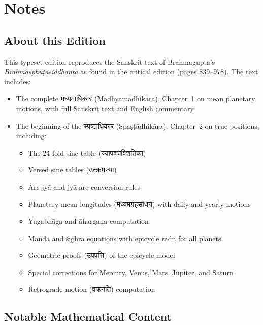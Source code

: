 \documentclass[11pt,a4paper]{book}
\newcommand{\dev}[1]{{\devanagarifont #1}}
\begin{document}
\clearpage

\appendix
\chapter{Notes}

\section{About this Edition}

This typeset edition reproduces the Sanskrit text of Brahmagupta's \emph{Brāhmasphuṭasiddhānta} as found in the critical edition (pages 839--978). The text includes:

\begin{itemize}
\item The complete \dev{मध्यमाधिकार} (Madhyamādhikāra), Chapter~1 on mean planetary motions, with full Sanskrit text and English commentary
\item The beginning of the \dev{स्पष्टाधिकार} (Spaṣṭādhikāra), Chapter~2 on true positions, including:
  \begin{itemize}
  \item The 24-fold sine table (\dev{ज्यापञ्चविंशतिका})
  \item Versed sine tables (\dev{उत्क्रमज्या})
  \item Arc-jyā and jyā-arc conversion rules
  \item Planetary mean longitudes (\dev{मध्यमग्रहसाधन}) with daily and yearly motions
  \item Yugabhāga and āhargaṇa computation
  \item Manda and śīghra equations with epicycle radii for all planets
  \item Geometric proofs (\dev{उपपत्ति}) of the epicycle model
  \item Special corrections for Mercury, Venus, Mars, Jupiter, and Saturn
  \item Retrograde motion (\dev{वक्रगति}) computation
  \end{itemize}
\end{itemize}

\section{Notable Mathematical Content}
\end{document}
